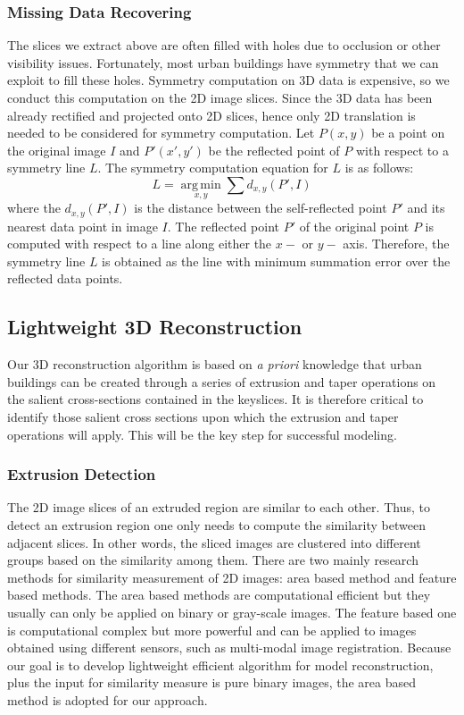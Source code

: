 \documentclass[12pt,letterpaper]{article}
\begin{document}
\subsubsection{Missing Data Recovering}
\label{sec_mdr}
The slices we extract above are often filled with holes due to occlusion
or other visibility issues.
Fortunately, most urban buildings have symmetry that we can exploit to
fill these holes.
Symmetry computation on 3D data \cite{Sym_PSGRF,Sym_ZPA,Sym_TW,Sym_MGP} is expensive,
so we conduct this computation on the 2D image slices.
Since the 3D data has been already rectified \cite{RDP_LSYGS} and projected onto 2D slices, hence only 2D translation
is needed to be considered for symmetry computation.
Let $P(x,y)$ be a point on the original image $I$ and $P'(x',y')$ be the reflected
point of $P$ with respect to a symmetry line $L$.
The symmetry computation equation for $L$ is as follows:
\begin{equation}
L = \underset{x,y}{\operatorname{arg\,min}}\sum{d_{x,y}(P', I)}
\end{equation}
where the $d_{x,y}(P',I)$ is the distance between the self-reflected point
$P'$ and its nearest data point in image $I$.
The reflected point $P'$ of the original point $P$ is computed with
respect to a line along either the $x-$ or $y-$ axis.
Therefore, the symmetry line $L$ is obtained as the line with minimum
summation error over the reflected data points.


\subsection{Lightweight 3D Reconstruction}
\label{sec_reconst}
Our 3D reconstruction algorithm is based on \emph{a priori} knowledge that
urban buildings can be created through a series of extrusion and taper
operations on the salient cross-sections contained in the keyslices.
It is therefore critical to identify those salient cross sections upon
which the extrusion and taper operations will apply.
This will be the key step for successful modeling.

\subsubsection{Extrusion Detection}
\label{sec_ksd}
The 2D image slices of an extruded region are similar to each other.
Thus, to detect an extrusion region one only needs to compute
the similarity between adjacent slices.
In other words, the sliced images are clustered into different groups based on the similarity among them.
There are two mainly research methods for similarity measurement of 2D images: area based method and feature based
methods. The area based methods are computational efficient but they usually can only be applied on
binary or gray-scale images. The feature based one is computational complex but more powerful and can be applied
to images obtained using different sensors, such as multi-modal image registration.
Because our goal is to develop lightweight efficient algorithm for model reconstruction, plus
the input for similarity measure is pure binary images, the area based method is adopted for our approach.
\end{document}
